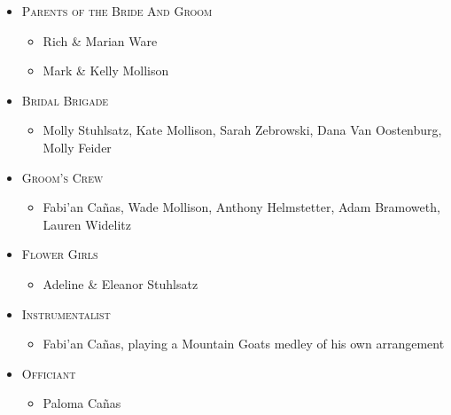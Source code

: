 \documentclass[12pt]{article}
\begin{document}
\begin{minipage}[t]{0.495\textwidth}
\centering

\vspace*{.23in}

\begin{itemize}

\item [] \textsc{Parents of the Bride And Groom}
\begin{itemize}[topsep=-5pt,itemsep=-1ex,partopsep=1ex,parsep=1ex]
\item [] Rich \& Marian Ware
\item [] Mark \& Kelly Mollison
\end{itemize}

\item [] \textsc{Bridal Brigade}
\begin{itemize}[topsep=-5pt,itemsep=-1ex,partopsep=1ex,parsep=1ex]
\item [] Molly Stuhlsatz, Kate Mollison, Sarah Zebrowski, 
Dana Van Oostenburg, Molly Feider
\end{itemize}

\item [] \textsc{Groom's Crew}
\begin{itemize}[topsep=-5pt,itemsep=-1ex,partopsep=1ex,parsep=1ex]
\item [] Fabi\a'an Ca\~{n}as, Wade Mollison, Anthony Helmstetter, 
Adam Bramoweth, Lauren Widelitz
\end{itemize}

\item [] \textsc{Flower Girls}
\begin{itemize}[topsep=-5pt,itemsep=-1ex,partopsep=1ex,parsep=1ex]
\item [] Adeline \& Eleanor Stuhlsatz
\end{itemize}

\item [] \textsc{Instrumentalist}
\begin{itemize}[topsep=-5pt,itemsep=-1ex,partopsep=1ex,parsep=1ex]
\item [] Fabi\a'an Ca\~{n}as, playing a Mountain Goats medley of his own arrangement
\end{itemize}

\item [] \textsc{Officiant}
\begin{itemize}[topsep=-5pt,itemsep=-1ex,partopsep=1ex,parsep=1ex]
\item [] Paloma Ca\~{n}as
\end{itemize}

\end{itemize}
\end{minipage}
\end{document}
